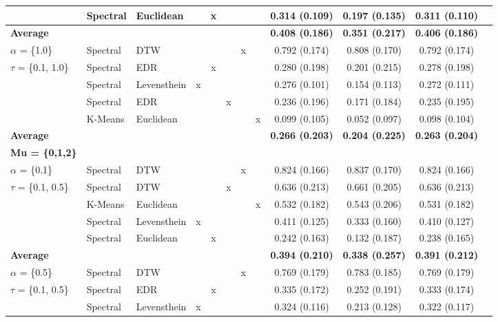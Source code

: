\documentclass[12pt,a4paper,bibliography=totocnumbered,listof=totocnumbered]{scrartcl}
\begin{document}
\begin{table}[!htbp]
{\begin{tabular}{@{\extracolsep{0pt}} lllccccccccc}
			& Spectral & Euclidean &  & x &  &  &  & 0.314 (0.109) & 0.197 (0.135) & 0.311 (0.110) \\ 
			\hline
			\textbf{Average} &  &  &  &  &  &  &  &   \textbf{0.408 (0.186)} &  \textbf{0.351 (0.217)} &  \textbf{0.406 (0.186)} \\ 
			\hline
			$\alpha$ = \{1.0\} & Spectral  & DTW &  &  &  & x &  & 0.792 (0.174) & 0.808 (0.170) & 0.792 (0.174) \\ 
			$\tau$ = \{0.1, 1.0\} &  Spectral  & EDR &  & x &  &  &  & 0.280 (0.198) & 0.201 (0.215) & 0.278 (0.198) \\ 
			& Spectral  & Levensthein & x &  &  &  &  & 0.276 (0.101) & 0.154 (0.113) & 0.272 (0.111) \\ 
			& Spectral  & EDR &  &  & x &  &  & 0.236 (0.196) & 0.171 (0.184) & 0.235 (0.195) \\ 
			& K-Means & Euclidean  &  &  &  &  & x & 0.099 (0.105) & 0.052 (0.097) & 0.098 (0.104) \\ 
			\hline
			\textbf{Average} &  &  &  &  &  &  &  &   \textbf{0.266 (0.203)} &  \textbf{0.204 (0.225)} &  \textbf{0.263 (0.204)} \\ 
			\hline
			\textbf{Mu = \{0,1,2\}} &  &  &  &  &  &  &  &  &  &  \\ 
			\hline
			$\alpha$ =  \{0.1\} & Spectral & DTW &  &  &  & x &  & 0.824 (0.166) & 0.837 (0.170) & 0.824 (0.166) \\ 
			$\tau$ = 	\{0.1, 0.5\} & Spectral & DTW &  &  & x &  &  & 0.636 (0.213) & 0.661 (0.205) & 0.636 (0.213) \\ 
			& K-Means & Euclidean &  &  &  &  & x & 0.532 (0.182) & 0.543 (0.206) & 0.531 (0.182) \\ 
			& Spectral & Levensthein & x &  &  &  &  & 0.411 (0.125) & 0.333 (0.160) & 0.410 (0.127) \\ 
			& Spectral & Euclidean &  & x &  &  &  & 0.242 (0.163) & 0.132 (0.187) & 0.238 (0.165) \\ 
			\hline
			\textbf{Average} &  &  &  &  &  &  &  &  \textbf{0.394 (0.210)} &  \textbf{0.338 (0.257)} &  \textbf{0.391 (0.212)} \\ 
			\hline
			$\alpha$ = \{0.5\} & Spectral & DTW &  &  &  & x &  & 0.769 (0.179) & 0.783 (0.185) & 0.769 (0.179) \\ 
			$\tau$ =  \{0.1, 0.5\} & Spectral & EDR &  & x &  &  &  & 0.335 (0.172) & 0.252 (0.191) & 0.333 (0.174) \\ 
			& Spectral & Levensthein & x &  &  &  &  & 0.324 (0.116) & 0.213 (0.128) & 0.322 (0.117) \\ 

\end{tabular}}
\end{table}
\end{document}

